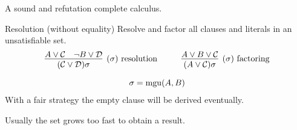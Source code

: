 
	\begin{goal}
		A sound and refutation complete calculus.
	\end{goal}
	
	\begin{block}{Resolution (without equality)}
		Resolve and factor all clauses and literals in an unsatisfiable set. 
		\begin{gather*}
			\infer
			[(\sigma)\text{ resolution}]
			{(\mcC \lor \mcD)\sigma}
			{{A} \lor\mcC & {\lnot B} \lor\mcD}
			\hspace{1cm}
			\infer
			[(\sigma)\text{ factoring}]
			{(A \lor \mcC)\sigma}
			{{A}\lor B\lor\mcC} \\[0.7em]
			\sigma = \mgu(A,B)
		\end{gather*}
		With a fair strategy the empty clause will be derived eventually.
	\end{block}
	
	\begin{observation}
		Usually the set grows too fast to obtain a result.
	\end{observation}